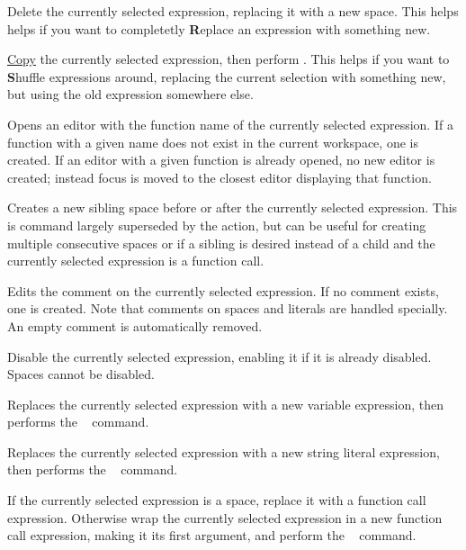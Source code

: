 Delete the currently selected expression, replacing it with a new space. This
helps helps if you want to completetly \textbf{R}eplace an expression with
something new.

\hyperref[cmd:copy]{Copy} the currently selected expression, then perform
\hyperref[cmd:delete_blank]{}. This helps if you want
to \textbf{S}huffle expressions around, replacing the current selection with
something new, but using the old expression somewhere else.

Opens an editor with the function name of the currently selected expression.
If a function with a given name does not exist in the current workspace, one is
created.
If an editor with a given function is already opened, no new editor is created;
instead focus is moved to the closest editor displaying that function.


Creates a new sibling space before or after the currently selected
expression. This is command largely superseded by the
\hyperref[cmd:smart_space]{} \keys{\SPACE} action, but can be
useful for creating multiple consecutive spaces or if a sibling is desired
instead of a child and the currently selected expression is a function call.

Edits the comment on the currently selected expression. If no comment exists,
one is created. Note that comments on spaces and literals are handled
specially. An empty comment is automatically removed.

Disable the currently selected expression, enabling it if it is already
disabled. Spaces cannot be disabled.

Replaces the currently selected expression with a new variable expression, then
performs the \hyperref[cmd:edit]{}~\keys{\return} command.

Replaces the currently selected expression with a new string literal
expression, then
performs the \hyperref[cmd:edit]{}~\keys{\return} command.

If the currently selected expression is a space, replace it with a function
call expression. Otherwise wrap the currently selected expression in a new
function call expression, making it its first argument, and perform
the \hyperref[cmd:edit]{}~\keys{\return} command.

